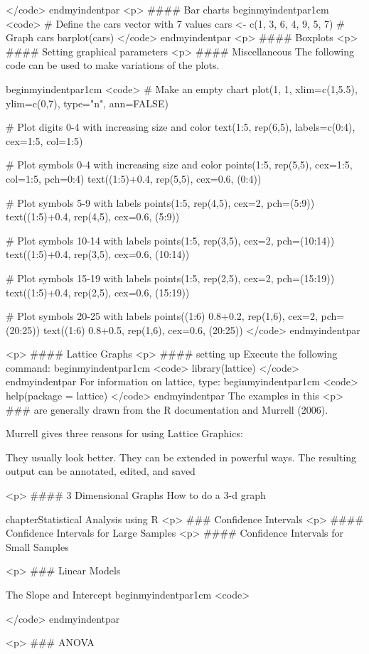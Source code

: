 </code>
end{myindentpar}
<p>
#### {Bar charts}
begin{myindentpar}{1cm}
<code>
# Define the cars vector with 7 values
cars <- c(1, 3, 6, 4, 9, 5, 7)
# Graph cars
barplot(cars)
</code>
end{myindentpar}
<p>
#### {Boxplots}
<p>
#### {Setting graphical parameters}
<p>
#### {Miscellaneous}
The following code can be used to make variations of the plots.

begin{myindentpar}{1cm}
 <code>
# Make an empty chart
plot(1, 1, xlim=c(1,5.5), ylim=c(0,7), type="n", ann=FALSE)

# Plot digits 0-4 with increasing size and color
text(1:5, rep(6,5), labels=c(0:4), cex=1:5, col=1:5)

# Plot symbols 0-4 with increasing size and color
points(1:5, rep(5,5), cex=1:5, col=1:5, pch=0:4)
text((1:5)+0.4, rep(5,5), cex=0.6, (0:4))

# Plot symbols 5-9 with labels
points(1:5, rep(4,5), cex=2, pch=(5:9))
text((1:5)+0.4, rep(4,5), cex=0.6, (5:9))

# Plot symbols 10-14 with labels
points(1:5, rep(3,5), cex=2, pch=(10:14))
text((1:5)+0.4, rep(3,5), cex=0.6, (10:14))

# Plot symbols 15-19 with labels
points(1:5, rep(2,5), cex=2, pch=(15:19))
text((1:5)+0.4, rep(2,5), cex=0.6, (15:19))

# Plot symbols 20-25 with labels
points((1:6)     0.8+0.2, rep(1,6), cex=2, pch=(20:25))
text((1:6)     0.8+0.5, rep(1,6), cex=0.6, (20:25))
</code>
end{myindentpar}

<p>
#### {Lattice Graphs}
<p>
#### {setting up}
Execute the following command:
begin{myindentpar}{1cm}
<code>
library(lattice)
</code>
end{myindentpar}
For information on lattice, type:
begin{myindentpar}{1cm}
<code>
help(package = lattice)
</code>
end{myindentpar}
The examples in this <p>
###  are generally drawn from the R documentation and Murrell (2006).

Murrell gives three reasons for using Lattice Graphics:

They usually look better.
They can be extended in powerful ways.
The resulting output can be annotated, edited, and saved

<p>
#### {3 Dimensional Graphs}
How to do a 3-d graph


chapter{Statistical Analysis using R}
<p>
### {Confidence Intervals}
<p>
#### {Confidence Intervals for Large Samples}
<p>
#### {Confidence Intervals for Small Samples}

<p>
### {Linear Models}

The Slope and Intercept
begin{myindentpar}{1cm}
<code>

</code>
end{myindentpar}

<p>
### {ANOVA}
